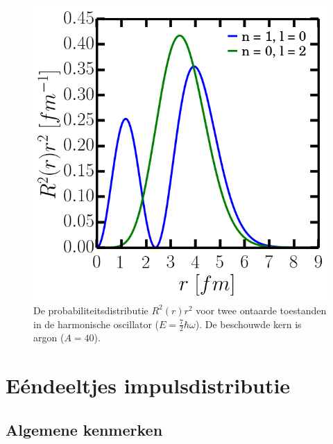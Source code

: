\documentclass[11pt,twoside]{book}
\begin{document}
\begin{figure}[H]
\centering
\includegraphics[scale=0.43]{./figuren/waves.png}
\caption{De probabiliteitsdistributie $R^2(r)r^2$ voor twee ontaarde toestanden in de harmonische oscillator  ($E = \frac{7}{2} \hbar \omega$). De beschouwde kern is argon ($A= 40$).}
\label{fig:ho_waves}
\end{figure}





\chapter{E\'{e}ndeeltjes impulsdistributie} \label{eendeeltjes}
\section{Algemene kenmerken}
\end{document}
